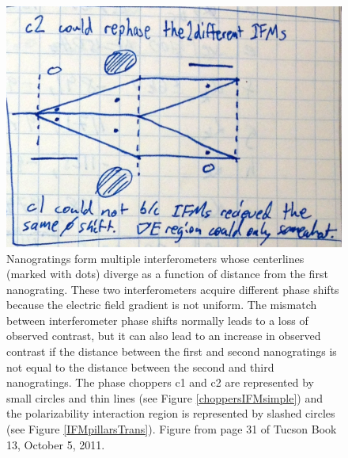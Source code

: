 \begin{figure}
\includegraphics[width=1\textwidth]{Figures/lens2IFMnotebook.png}
\caption[Sketch of chopper 1, the polarizability electrodes, and chopper 2 with a two interferometer model.]{\label{lens2IFM}Nanogratings form multiple interferometers whose centerlines (marked with dots) diverge as a function of distance from the first nanograting. These two interferometers acquire different phase shifts because the electric field gradient is not uniform. The mismatch between interferometer phase shifts normally leads to a loss of observed contrast, but it can also lead to an increase in observed contrast if the distance between the first and second nanogratings is not equal to the distance between the second and third nanogratings. The phase choppers c1 and c2 are represented by small circles and thin lines (see Figure \ref{choppersIFMsimple}) and the polarizability interaction region is represented by slashed circles (see Figure \ref{IFMpillarsTrans}). Figure from page 31 of Tucson Book 13, October 5, 2011.}
\end{figure}




